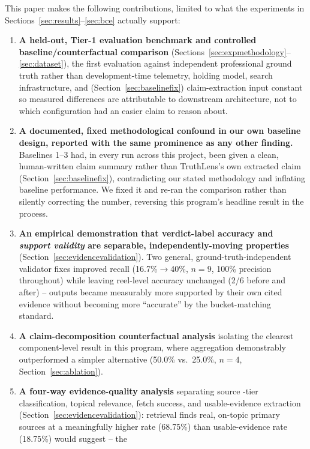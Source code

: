 \documentclass[conference]{IEEEtran}
\begin{document}
This paper makes the following contributions, limited to what the
experiments in Sections~\ref{sec:results}--\ref{sec:bce} actually support:

\begin{enumerate}
\item \textbf{A held-out, Tier-1 evaluation benchmark and controlled
  baseline/counterfactual comparison} (Sections~\ref{sec:expmethodology}--
  \ref{sec:dataset}), the first evaluation against independent
  professional ground truth rather than development-time telemetry,
  holding model, search infrastructure, and (Section~\ref{sec:baselinefix})
  claim-extraction input constant so measured differences are
  attributable to downstream architecture, not to which configuration had
  an easier claim to reason about.
\item \textbf{A documented, fixed methodological confound in our own
  baseline design, reported with the same prominence as any other
  finding.} Baselines 1--3 had, in every run across this project, been
  given a clean, human-written claim summary rather than TruthLens's own
  extracted claim (Section~\ref{sec:baselinefix}), contradicting our
  stated methodology and inflating baseline performance. We fixed it and
  re-ran the comparison rather than silently correcting the number,
  reversing this program's headline result in the process.
\item \textbf{An empirical demonstration that verdict-label accuracy and
  \emph{support validity} are separable, independently-moving properties}
  (Section~\ref{sec:evidencevalidation}). Two general,
  ground-truth-independent validator fixes improved recall
  (16.7\%$\to$40\%, $n=9$, 100\% precision throughout) while leaving
  reel-level accuracy unchanged (2/6 before and after) -- outputs became
  measurably more supported by their own cited evidence without becoming
  more ``accurate'' by the bucket-matching standard.
\item \textbf{A claim-decomposition counterfactual analysis} isolating
  the clearest component-level result in this program, where aggregation
  demonstrably outperformed a simpler alternative (50.0\% vs.\ 25.0\%,
  $n=4$, Section~\ref{sec:ablation}).
\item \textbf{A four-way evidence-quality analysis} separating source
  -tier classification, topical relevance, fetch success, and
  usable-evidence extraction (Section~\ref{sec:evidencevalidation}):
  retrieval finds real, on-topic primary sources at a meaningfully higher
  rate (68.75\%) than usable-evidence rate (18.75\%) would suggest -- the

\end{enumerate}
\end{document}
